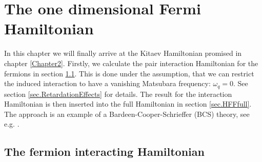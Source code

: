 
\chapter{The one dimensional Fermi Hamiltonian} %

\label{Chapter4} %


In this chapter we will finally arrive at the Kitaev Hamiltonian promised in chapter \ref{Chapter2}. Firstly, we calculate the pair interaction Hamiltonian for the fermions in section \ref{sec.HFFint}. This is done under the assumption, that we can restrict the induced interaction to have a vanishing Matsubara frequency: $\omega_q = 0$. See section \ref{sec.RetardationEffects} for details. The result for the interaction Hamiltonian is then inserted into the full Hamiltonian in section \ref{sec.HFFfull}. The approach is an example of a Bardeen-Cooper-Schrieffer (BCS) theory, see e.g. \cite{Tinkham,LandauStatPhys2,PlischkeStatPhys}. 

\section{The fermion interacting Hamiltonian} \label{sec.HFFint}

